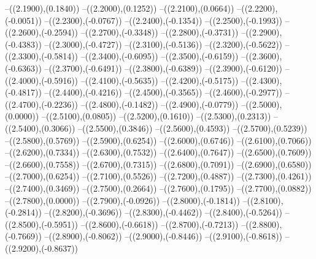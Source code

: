 {	--({\sx*(2.1900)},{\sy*(0.1840)})
	--({\sx*(2.2000)},{\sy*(0.1252)})
	--({\sx*(2.2100)},{\sy*(0.0664)})
	--({\sx*(2.2200)},{\sy*(-0.0051)})
	--({\sx*(2.2300)},{\sy*(-0.0767)})
	--({\sx*(2.2400)},{\sy*(-0.1354)})
	--({\sx*(2.2500)},{\sy*(-0.1993)})
	--({\sx*(2.2600)},{\sy*(-0.2594)})
	--({\sx*(2.2700)},{\sy*(-0.3348)})
	--({\sx*(2.2800)},{\sy*(-0.3731)})
	--({\sx*(2.2900)},{\sy*(-0.4383)})
	--({\sx*(2.3000)},{\sy*(-0.4727)})
	--({\sx*(2.3100)},{\sy*(-0.5136)})
	--({\sx*(2.3200)},{\sy*(-0.5622)})
	--({\sx*(2.3300)},{\sy*(-0.5814)})
	--({\sx*(2.3400)},{\sy*(-0.6095)})
	--({\sx*(2.3500)},{\sy*(-0.6159)})
	--({\sx*(2.3600)},{\sy*(-0.6363)})
	--({\sx*(2.3700)},{\sy*(-0.6491)})
	--({\sx*(2.3800)},{\sy*(-0.6389)})
	--({\sx*(2.3900)},{\sy*(-0.6120)})
	--({\sx*(2.4000)},{\sy*(-0.5916)})
	--({\sx*(2.4100)},{\sy*(-0.5635)})
	--({\sx*(2.4200)},{\sy*(-0.5175)})
	--({\sx*(2.4300)},{\sy*(-0.4817)})
	--({\sx*(2.4400)},{\sy*(-0.4216)})
	--({\sx*(2.4500)},{\sy*(-0.3565)})
	--({\sx*(2.4600)},{\sy*(-0.2977)})
	--({\sx*(2.4700)},{\sy*(-0.2236)})
	--({\sx*(2.4800)},{\sy*(-0.1482)})
	--({\sx*(2.4900)},{\sy*(-0.0779)})
	--({\sx*(2.5000)},{\sy*(0.0000)})
	--({\sx*(2.5100)},{\sy*(0.0805)})
	--({\sx*(2.5200)},{\sy*(0.1610)})
	--({\sx*(2.5300)},{\sy*(0.2313)})
	--({\sx*(2.5400)},{\sy*(0.3066)})
	--({\sx*(2.5500)},{\sy*(0.3846)})
	--({\sx*(2.5600)},{\sy*(0.4593)})
	--({\sx*(2.5700)},{\sy*(0.5239)})
	--({\sx*(2.5800)},{\sy*(0.5769)})
	--({\sx*(2.5900)},{\sy*(0.6254)})
	--({\sx*(2.6000)},{\sy*(0.6746)})
	--({\sx*(2.6100)},{\sy*(0.7066)})
	--({\sx*(2.6200)},{\sy*(0.7334)})
	--({\sx*(2.6300)},{\sy*(0.7532)})
	--({\sx*(2.6400)},{\sy*(0.7647)})
	--({\sx*(2.6500)},{\sy*(0.7609)})
	--({\sx*(2.6600)},{\sy*(0.7558)})
	--({\sx*(2.6700)},{\sy*(0.7315)})
	--({\sx*(2.6800)},{\sy*(0.7091)})
	--({\sx*(2.6900)},{\sy*(0.6580)})
	--({\sx*(2.7000)},{\sy*(0.6254)})
	--({\sx*(2.7100)},{\sy*(0.5526)})
	--({\sx*(2.7200)},{\sy*(0.4887)})
	--({\sx*(2.7300)},{\sy*(0.4261)})
	--({\sx*(2.7400)},{\sy*(0.3469)})
	--({\sx*(2.7500)},{\sy*(0.2664)})
	--({\sx*(2.7600)},{\sy*(0.1795)})
	--({\sx*(2.7700)},{\sy*(0.0882)})
	--({\sx*(2.7800)},{\sy*(0.0000)})
	--({\sx*(2.7900)},{\sy*(-0.0926)})
	--({\sx*(2.8000)},{\sy*(-0.1814)})
	--({\sx*(2.8100)},{\sy*(-0.2814)})
	--({\sx*(2.8200)},{\sy*(-0.3696)})
	--({\sx*(2.8300)},{\sy*(-0.4462)})
	--({\sx*(2.8400)},{\sy*(-0.5264)})
	--({\sx*(2.8500)},{\sy*(-0.5951)})
	--({\sx*(2.8600)},{\sy*(-0.6618)})
	--({\sx*(2.8700)},{\sy*(-0.7213)})
	--({\sx*(2.8800)},{\sy*(-0.7669)})
	--({\sx*(2.8900)},{\sy*(-0.8062)})
	--({\sx*(2.9000)},{\sy*(-0.8446)})
	--({\sx*(2.9100)},{\sy*(-0.8618)})
	--({\sx*(2.9200)},{\sy*(-0.8637)})
}
